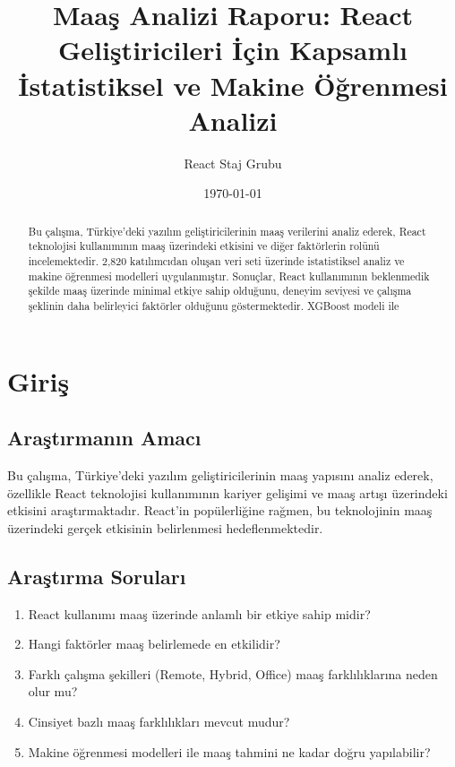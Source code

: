 \documentclass[12pt,a4paper]{article}
\title{\textbf{Maaş Analizi Raporu: React Geliştiricileri İçin Kapsamlı İstatistiksel ve Makine Öğrenmesi Analizi}}
\author{React Staj Grubu}
\date{\today}
\begin{document}
\maketitle

\begin{abstract}
Bu çalışma, Türkiye'deki yazılım geliştiricilerinin maaş verilerini analiz ederek, React teknolojisi kullanımının maaş üzerindeki etkisini ve diğer faktörlerin rolünü incelemektedir. 2,820 katılımcıdan oluşan veri seti üzerinde istatistiksel analiz ve makine öğrenmesi modelleri uygulanmıştır. Sonuçlar, React kullanımının beklenmedik şekilde maaş üzerinde minimal etkiye sahip olduğunu, deneyim seviyesi ve çalışma şeklinin daha belirleyici faktörler olduğunu göstermektedir. XGBoost modeli ile %
\end{abstract}

\tableofcontents
\newpage

\section{Giriş}

\subsection{Araştırmanın Amacı}
Bu çalışma, Türkiye'deki yazılım geliştiricilerinin maaş yapısını analiz ederek, özellikle React teknolojisi kullanımının kariyer gelişimi ve maaş artışı üzerindeki etkisini araştırmaktadır. React'in popülerliğine rağmen, bu teknolojinin maaş üzerindeki gerçek etkisinin belirlenmesi hedeflenmektedir.

\subsection{Araştırma Soruları}
\begin{enumerate}
    \item React kullanımı maaş üzerinde anlamlı bir etkiye sahip midir?
    \item Hangi faktörler maaş belirlemede en etkilidir?
    \item Farklı çalışma şekilleri (Remote, Hybrid, Office) maaş farklılıklarına neden olur mu?
    \item Cinsiyet bazlı maaş farklılıkları mevcut mudur?
    \item Makine öğrenmesi modelleri ile maaş tahmini ne kadar doğru yapılabilir?
\end{enumerate}
\end{document}
